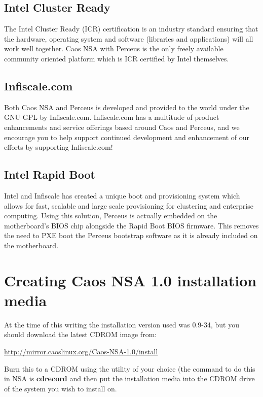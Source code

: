 \documentclass[10pt,letterpaper]{article}
\begin{document}
\subsection{Intel Cluster Ready}
The Intel Cluster Ready (ICR) certification is an industry standard
ensuring that the hardware, operating system and software (libraries and
applications) will all work well together. Caos NSA with Perceus is the only
freely available community oriented platform which is ICR certified by Intel
themselves.

\subsection{Infiscale.com}
Both Caos NSA and Perceus is developed and provided to the world under the
GNU GPL by Infiscale.com. Infiscale.com has a multitude of product
enhancements and service offerings based around Caos and Perceus, and we
encourage you to help support continued development and enhancement of
our efforts by supporting Infiscale.com!

\subsection{Intel Rapid Boot}
Intel and Infiscale has created a unique boot and provisioning system which
allows for fast, scalable and large scale provisioning for clustering and
enterprise computing. Using this solution, Perceus is actually embedded on
the motherboard's BIOS chip alongside the Rapid Boot BIOS firmware. This
removes the need to PXE boot the Perceus bootstrap software as it is already
included on the motherboard.

\section{Creating Caos NSA 1.0 installation media}
At the time of this writing the installation version used was 0.9-34, but
you should download the latest CDROM image from:

{\ttfamily
\indent \url{http://mirror.caoslinux.org/Caos-NSA-1.0/install}
}


Burn this to a CDROM using the utility of your choice (the command to do
this in NSA is {\bf cdrecord} and then put the installation media into the
CDROM drive of the system you wish to install on.
\end{document}
